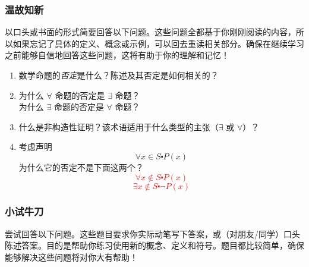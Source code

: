 \subsubsection*{温故知新}

以口头或书面的形式简要回答以下问题。这些问题全都基于你刚刚阅读的内容，所以如果忘记了具体的定义、概念或示例，可以回去重读相关部分。确保在继续学习之前能够自信地回答这些问题，这将有助于你的理解和记忆！

\begin{enumerate}[label=(\arabic*)]
    \item 数学命题的\emph{否定}是什么？陈述及其否定是如何相关的？
    \item 为什么 $\forall$ 命题的否定是 $\exists$ 命题？\\
        为什么 $\exists$ 命题的否定是 $\forall$ 命题？
    \item 什么是非构造性证明？该术语适用于什么类型的主张（$\exists$ 或 $\forall$）？
    \item 考虑声明
        \[\forall x \in S \centerdot P(x)\]
        为什么它的否定不是下面这两个？
        \textcolor{red}{
            \[\forall x \notin S \centerdot P(x)\]
            \[\exists x \notin S \centerdot \neg P(x)\]
        }
\end{enumerate}

\subsubsection*{小试牛刀}

尝试回答以下问题。这些题目要求你实际动笔写下答案，或（对朋友/同学）口头陈述答案。目的是帮助你练习使用新的概念、定义和符号。题目都比较简单，确保能够解决这些问题将对你大有帮助！

